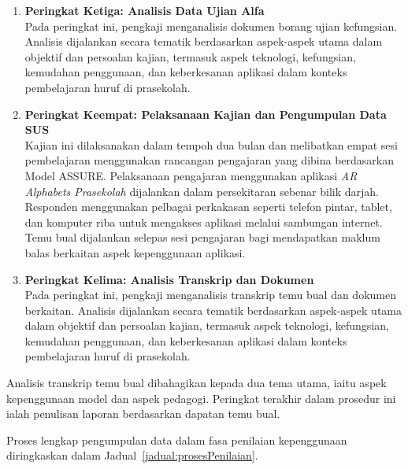 \begin{itemize}
\begin{enumerate}
  \item \textbf{Peringkat Ketiga: Analisis Data Ujian Alfa} \\
  Pada peringkat ini, pengkaji menganalisis dokumen borang ujian kefungsian. Analisis dijalankan secara tematik berdasarkan aspek-aspek utama dalam objektif dan persoalan kajian, termasuk aspek teknologi, kefungsian, kemudahan penggunaan, dan keberkesanan aplikasi dalam konteks pembelajaran huruf di prasekolah.

  \item \textbf{Peringkat Keempat: Pelaksanaan Kajian dan Pengumpulan Data SUS} \\
  Kajian ini dilaksanakan dalam tempoh dua bulan dan melibatkan empat sesi pembelajaran menggunakan rancangan pengajaran yang dibina berdasarkan Model ASSURE. Pelaksanaan pengajaran menggunakan aplikasi \textit{AR Alphabets Prasekolah} dijalankan dalam persekitaran sebenar bilik darjah. Responden menggunakan pelbagai perkakasan seperti telefon pintar, tablet, dan komputer riba untuk mengakses aplikasi melalui sambungan internet. Temu bual dijalankan selepas sesi pengajaran bagi mendapatkan maklum balas berkaitan aspek kepenggunaan aplikasi.

  \item \textbf{Peringkat Kelima: Analisis Transkrip dan Dokumen} \\
  Pada peringkat ini, pengkaji menganalisis transkrip temu bual dan dokumen berkaitan. Analisis dijalankan secara tematik berdasarkan aspek-aspek utama dalam objektif dan persoalan kajian, termasuk aspek teknologi, kefungsian, kemudahan penggunaan, dan keberkesanan aplikasi dalam konteks pembelajaran huruf di prasekolah.
\end{enumerate}

Analisis transkrip temu bual dibahagikan kepada dua tema utama, iaitu aspek kepenggunaan model dan aspek pedagogi. Peringkat terakhir dalam prosedur ini ialah penulisan laporan berdasarkan dapatan temu bual.

Proses lengkap pengumpulan data dalam fasa penilaian kepenggunaan diringkaskan dalam Jadual~\ref{jadual:prosesPenilaian}.


\end{itemize}
